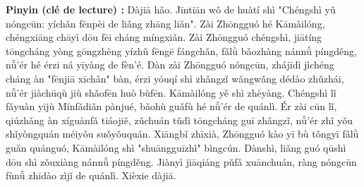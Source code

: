 \documentclass[11pt]{article}
\begin{document}
\begin{exoresolu}
\textbf{Pinyin (clé de lecture) :}
Dàjiā hǎo. Jīntiān wǒ de huàtí shì "Chéngshì yǔ nóngcūn: yíchǎn fēnpèi de liǎng zhāng liǎn".
Zài Zhōngguó hé Kāmàilóng, chéngxiāng chāyì dōu fēi cháng míngxiǎn.
Zài Zhōngguó chéngshì, jiātíng tōngcháng yòng gōngzhèng yízhǔ fēngē fángchǎn, fǎlǜ bǎozhàng nánnǚ píngděng, nǚ'ér hé érzi ná yīyàng de fèn'é.
Dàn zài Zhōngguó nóngcūn, zhájīdì jìchéng cháng àn "fēnjiā xīchǎn" bàn, érzi yóuqí shì zhǎngzǐ wǎngwǎng dédào zhǔzhái, nǚ'ér jiàchūqù jiù shǎofēn huò bùfēn.
Kāmàilóng yě shì zhèyàng. Chéngshì lǐ fǎyuàn yījù Mínfǎdiǎn pànjué, bǎohù guǎfù hé nǚ'ér de quánlì.
Ér zài cūn lǐ, qiúzhǎng àn xíguànfǎ tiáojiě, zǔchuán tǔdì tōngcháng guī zhǎngzǐ, nǚ'ér zhǐ yǒu shǐyòngquán méiyǒu suǒyǒuquán.
Xiāngbǐ zhīxià, Zhōngguó kào yī bù tǒngyī fǎlǜ guǎn quánguó, Kāmàilóng shì "shuāngguīzhì" bìngcún.
Dànshì, liǎng guó qūshì dōu shì zǒuxiàng nánnǚ píngděng.
Jiànyì jiāqiáng pǔfǎ xuānchuán, ràng nóngcūn fùnǚ zhīdào zìjǐ de quánlì. Xièxie dàjiā.
\end{exoresolu}
\end{document}
